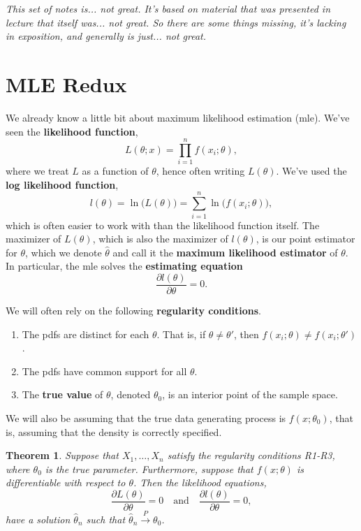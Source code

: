 \documentclass[12pt]{article}
\newcommand{\sumn}{\sum_{i=1}^n}
\newcommand{\thetahat}{\hat{\theta}}
\newcommand{\cprob}{\overset{P}{\rightarrow}}
\renewcommand{\hat}[1]{\widehat{#1}}
\newtheorem{theorem}{Theorem}
\theoremstyle{definition}
\begin{document}
\maketitle
\onehalfspace


\noindent \emph{This set of notes is... not great. It's based on material that was presented in lecture that itself was... not great. So there are some things missing, it's lacking in exposition, and generally is just... not great. }


\section{MLE Redux}

We already know a little bit about maximum likelihood estimation (mle). We've seen the \textbf{likelihood function},
	\[L(\theta;x) = \prod_{i=1}^n f(x_i;\theta),	\]
where we treat $L$ as a function of $\theta$, hence often writing $L(\theta)$. We've used the \textbf{log likelihood function},
	\[l(\theta) = \ln\big(L(\theta)\big) = \sumn \ln\big(f(x_i;\theta) \big),	\]
which is often easier to work with than the likelihood function itself. The maximizer of $L(\theta)$, which is also the maximizer of $l(\theta)$, is our point estimator for $\theta$, which we denote $\widehat{\theta}$ and call it the \textbf{maximum likelihood estimator} of $\theta$. In particular, the mle solves the \textbf{estimating equation}
	\[\frac{\partial l(\theta)}{\partial \theta} =0.	\]


We will often rely on the following \textbf{regularity conditions}.
\begin{enumerate}[label=\textbf{(R\arabic*)}]
	\item The pdfs are distinct for each $\theta$. That is, if $\theta \neq \theta'$, then $f(x_i;\theta) \neq f(x_i;\theta')$. 
	\item The pdfs have common support for all $\theta$.
	\item The \textbf{true value} of $\theta$, denoted $\theta_0$, is an interior point of the sample space. 
\end{enumerate}
 We will also be assuming that the true data generating process is $f(x; \theta_0)$, that is, assuming that the density is correctly specified. 
 
 \begin{theorem}
 	Suppose that $X_1, \hdots, X_n$ satisfy the regularity conditions R1-R3, where $\theta_0$ is the true parameter. Furthermore, suppose that $f(x;\theta)$ is differentiable with respect to $\theta$. Then the likelihood equations,
 		\[\frac{\partial L(\theta)}{\partial \theta}=0 \quad \text{and} \quad \frac{\partial l(\theta)}{\partial \theta}=0,	\]
have a solution $\thetahat_n$ such that $\thetahat_n \cprob \theta_0$. 
 \end{theorem}
 
\end{document}
